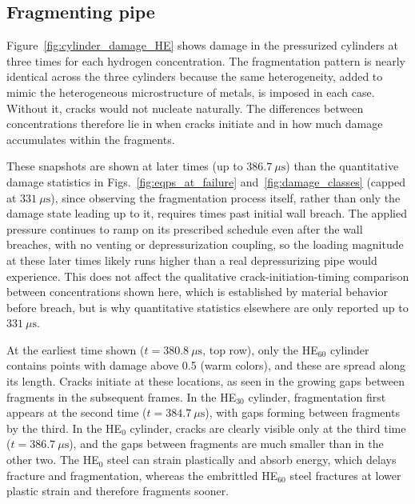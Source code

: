 \documentclass[pdflatex,sn-mathphys-num]{sn-jnl}%
\theoremstyle{thmstyleone}%
\theoremstyle{thmstyletwo}%
\theoremstyle{thmstylethree}%
\begin{document}
\subsection{Fragmenting pipe}\label{subsec5c}
Figure~\ref{fig:cylinder_damage_HE} shows damage in the pressurized cylinders at three times for each hydrogen concentration. The fragmentation pattern is nearly identical across the three cylinders because the same heterogeneity, added to mimic the heterogeneous microstructure of metals, is imposed in each case. Without it, cracks would not nucleate naturally. The differences between concentrations therefore lie in when cracks initiate and in how much damage accumulates within the fragments.

These snapshots are shown at later times (up to $386.7~\mu\mathrm{s}$) than the quantitative damage
statistics in Figs.~\ref{fig:eqps_at_failure} and~\ref{fig:damage_classes} (capped at
$331~\mu\mathrm{s}$), since observing the fragmentation process itself, rather than only the damage
state leading up to it, requires times past initial wall breach. The applied pressure continues to
ramp on its prescribed schedule even after the wall breaches, with no venting or depressurization
coupling, so the loading magnitude at these later times likely runs higher than a real depressurizing
pipe would experience.  This does not affect the qualitative crack-initiation-timing comparison
between concentrations shown here, which is established by material behavior before breach, but is
why quantitative statistics elsewhere are only reported up to $331~\mu\mathrm{s}$.

At the earliest time shown ($t=380.8~\mu\mathrm{s}$, top row), only the HE$_{60}$ cylinder contains points with damage above 0.5 (warm colors), and these are spread along its length. Cracks initiate at these locations, as seen in the growing gaps between fragments in the subsequent frames. In the HE$_{30}$ cylinder, fragmentation first appears at the second time ($t=384.7~\mu\mathrm{s}$), with gaps forming between fragments by the third. In the HE$_{0}$ cylinder, cracks are clearly visible only at the third time ($t=386.7~\mu\mathrm{s}$), and the gaps between fragments are much smaller than in the other two. The HE$_{0}$ steel can strain plastically and absorb energy, which delays fracture and fragmentation, whereas the embrittled HE$_{60}$ steel fractures at lower plastic strain and therefore fragments sooner.
\end{document}
